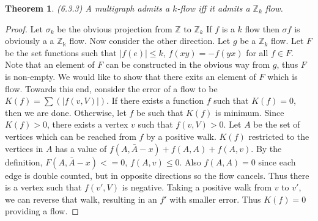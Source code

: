 \documentclass[12pt]{article}
\newtheorem{theorem}{Theorem}
\begin{document}
\begin{theorem} (6.3.3) A multigraph admits a $k$-flow iff it admits a
  $\mathbb{Z}_k$ flow.
\end{theorem}
\begin{proof} Let $\sigma_k$ be the obvious projection from
  $\mathbb{Z}$ to $\mathbb{Z}_k$ If $f$ is a $k$ flow then $\sigma f$
  is obviously a a $\mathbb{Z_k}$ flow. Now consider the other
  direction. Let $g$ be a $\mathbb{Z}_k$ flow. Let $F$ be the set
  functions such that $|f(e)| \leq k$, $f(xy) = - f(yx)$ for all
  $f \in F$. Note that an element of $F$ can be constructed in the
  obvious way from $g$, thus $F$ is non-empty. We would like to show
  that there exits an element of $F$ which is flow. Towards this end,
  consider the error of a flow to be $K(f) = \sum(|f(v, V)|)$. If
  there exists a function $f$ such that $K(f) = 0$, then we are
  done. Otherwise, let $f$ be such that $K(f)$ is minimum. Since
  $K(f) > 0$, there exists a vertex $v$ such that $f(v,V) > 0$. Let
  $A$ be the set of vertices which can be reached from $f$ by a
  positive walk. $K(f)$ restricted to the vertices in $A$ has a value
  of $f(A, \bar A - x) + f(A,A) + f(A,v)$. By the definition,
  $F(A, \bar A - x) <= 0$, $f(A,v) \leq 0$. Also $f(A, A) = 0$ since
  each edge is double counted, but in opposite directions so the flow
  cancels. Thus there is a vertex such that $f(v', V)$ is
  negative. Taking a positive walk from $v$ to $v'$, we can reverse
  that walk, resulting in an $f'$ with smaller error. Thus $K(f) = 0$
  providing a flow.
\end{proof}
\end{document}
